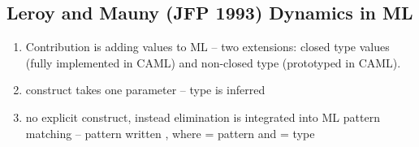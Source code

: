 \documentclass[12pt]{article}	%
\begin{document}
%	
%	

\subsection*{Leroy and Mauny (JFP 1993) Dynamics in ML}
\begin{enumerate}
	\item Contribution is adding \Dynamic values to ML -- two extensions: closed type \Dynamic values (fully implemented in CAML) and non-closed type (prototyped in CAML).
	\item \dynamic construct takes one parameter -- type is inferred
	\item no explicit \typecase construct, instead \Dynamic elimination is integrated into ML pattern matching -- pattern written , where  = pattern and  = type
\end{enumerate}
\end{document}

